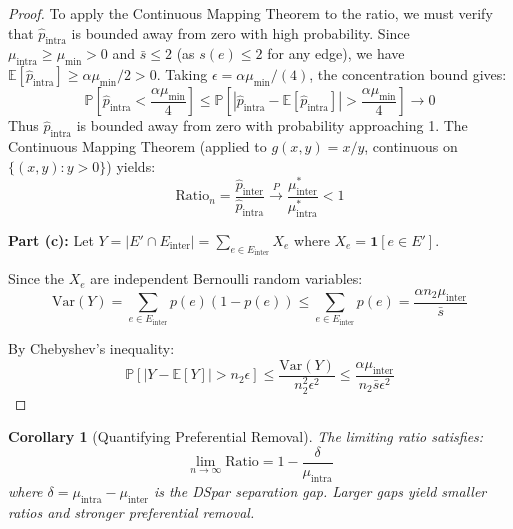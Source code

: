 \documentclass[10pt,journal,compsoc]{IEEEtran}
\newtheorem{corollary}{Corollary}
\begin{document}
\begin{proof}
To apply the Continuous Mapping Theorem to the ratio, we must verify that $\hat{p}_{\text{intra}}$ is bounded away from zero with high probability. Since $\mu_{\text{intra}} \geq \mu_{\min} > 0$ and $\bar{s} \leq 2$ (as $s(e) \leq 2$ for any edge), we have $\mathbb{E}[\hat{p}_{\text{intra}}] \geq \alpha \mu_{\min}/2 > 0$. Taking $\epsilon = \alpha \mu_{\min}/(4)$, the concentration bound gives:
\begin{equation}
\mathbb{P}\left[\hat{p}_{\text{intra}} < \frac{\alpha \mu_{\min}}{4}\right] \leq \mathbb{P}\left[|\hat{p}_{\text{intra}} - \mathbb{E}[\hat{p}_{\text{intra}}]| > \frac{\alpha \mu_{\min}}{4}\right] \to 0
\end{equation}
Thus $\hat{p}_{\text{intra}}$ is bounded away from zero with probability approaching 1. The Continuous Mapping Theorem (applied to $g(x,y) = x/y$, continuous on $\{(x,y): y > 0\}$) yields:
\begin{equation}
\text{Ratio}_n = \frac{\hat{p}_{\text{inter}}}{\hat{p}_{\text{intra}}} \xrightarrow{P} \frac{\mu_{\text{inter}}^*}{\mu_{\text{intra}}^*} < 1
\end{equation}

\textbf{Part (c):} Let $Y = |E' \cap E_{\text{inter}}| = \sum_{e \in E_{\text{inter}}} X_e$ where $X_e = \mathbf{1}[e \in E']$.

Since the $X_e$ are independent Bernoulli random variables:
\begin{equation}
\text{Var}(Y) = \sum_{e \in E_{\text{inter}}} p(e)(1 - p(e)) \leq \sum_{e \in E_{\text{inter}}} p(e) = \frac{\alpha n_2 \mu_{\text{inter}}}{\bar{s}}
\end{equation}

By Chebyshev's inequality:
\begin{equation}
\mathbb{P}[|Y - \mathbb{E}[Y]| > n_2 \epsilon] \leq \frac{\text{Var}(Y)}{n_2^2 \epsilon^2} \leq \frac{\alpha \mu_{\text{inter}}}{n_2 \bar{s} \epsilon^2}
\end{equation}
\end{proof}

\begin{corollary}[Quantifying Preferential Removal]
The limiting ratio satisfies:
\begin{equation}
\lim_{n \to \infty} \text{Ratio} = 1 - \frac{\delta}{\mu_{\text{intra}}}
\end{equation}
where $\delta = \mu_{\text{intra}} - \mu_{\text{inter}}$ is the DSpar separation gap. Larger gaps yield smaller ratios and stronger preferential removal.
\end{corollary}
\end{document}
